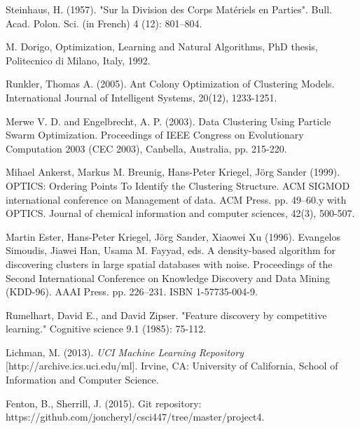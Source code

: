 \documentclass[conference]{IEEEtran}
\begin{document}
\begin{thebibliography}{1}

  Steinhaus, H. (1957). "Sur la Division des Corps Matériels en Parties". Bull. Acad. Polon. Sci. (in French) 4 (12): 801–804.

  M. Dorigo, Optimization, Learning and Natural Algorithms, PhD thesis, Politecnico di Milano, Italy, 1992.

  Runkler, Thomas A. (2005). Ant Colony Optimization of Clustering Models. International Journal of Intelligent Systems, 20(12), 1233-1251.

  Merwe V. D. and Engelbrecht, A. P. (2003). Data Clustering Using Particle Swarm Optimization. Proceedings of IEEE Congress on Evolutionary Computation 2003 (CEC 2003), Canbella, Australia, pp. 215-220.

  Mihael Ankerst, Markus M. Breunig, Hans-Peter Kriegel, Jörg Sander (1999). OPTICS: Ordering Points To Identify the Clustering Structure. ACM SIGMOD international conference on Management of data. ACM Press. pp. 49–60.y with OPTICS. Journal of chemical information and computer sciences, 42(3), 500-507.

  Martin Ester, Hans-Peter Kriegel, Jörg Sander, Xiaowei Xu (1996). Evangelos Simoudis, Jiawei Han, Usama M. Fayyad, eds. A density-based algorithm for discovering clusters in large spatial databases with noise. Proceedings of the Second International Conference on Knowledge Discovery and Data Mining (KDD-96). AAAI Press. pp. 226–231. ISBN 1-57735-004-9.

Rumelhart, David E., and David Zipser. "Feature discovery by competitive learning." Cognitive science 9.1 (1985): 75-112.

  Lichman, M. (2013). \textit{UCI Machine Learning Repository} [http://archive.ics.uci.edu/ml]. Irvine, CA: University of California, School of Information and Computer Science. 

  Fenton, B., Sherrill, J. (2015). Git repository: https://github.com/joncheryl/csci447/tree/master/project4.

\end{thebibliography}
\end{document}
